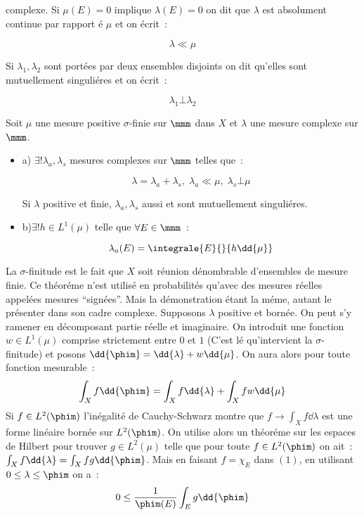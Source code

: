 complexe. Si $\mu(E) = 0$ implique $\lambda(E) = 0$ on dit que $\lambda$ est absolument continue par rapport é $\mu$
et on écrit~:\par
$$\lambda\ll \mu$$\par
Si $\lambda_1, \lambda_2$ sont portées par deux ensembles disjoints on dit qu'elles sont mutuellement singuliéres et
on écrit~:\par
$$\lambda_1\bot \lambda_2$$\par
{}
Soit $\mu$ une mesure positive $\sigma$-finie sur $\mmm$ dans $X$ et $\lambda$ une mesure complexe sur $\mmm$.
\begin{itemize}
\item{a)} $\exists !\lambda_a, \lambda_s$ mesures complexes sur $\mmm$ telles que~:\par
$$\lambda = \lambda_a + \lambda_s,\; \lambda_a\ll \mu,\; \lambda_s\bot\mu$$\par
Si $\lambda$ positive et finie, $\lambda_a,\lambda_s$ aussi et sont mutuellement singuliéres.
\item{b)}$\exists ! h\in L^1(\mu)$ telle que $\forall E\in \mmm$~:\par
$$\lambda_a(E) = \integrale{E}{}{h\dd{\mu}}$$
\end{itemize}
La $\sigma$-finitude est le fait que $X$ soit réunion dénombrable d'ensembles de mesure finie.
\rmq Ce théoréme n'est utilisé en probabilités qu'avec des mesures réelles appelées mesures ``signées''. Mais la 
démonstration étant la méme, autant le présenter dans son cadre complexe. 
\dem Supposons $\lambda$ positive et bornée. On peut s'y ramener en décomposant partie réelle et imaginaire. On 
introduit une fonction $w\in L^1(\mu)$ comprise strictement entre $0$ et $1$ (C'est lé qu'intervient la 
$\sigma$-finitude) et posons $\dd{\phim} = \dd{\lambda}+ w\dd{\mu}$. On aura alors pour toute fonction mesurable~:
\begin{equation}
\int_X f\dd{\phim} = \int_X f\dd{\lambda} + \int_X fw\dd{\mu}
\end{equation}
Si $f\in L^2(\phim)$ l'inégalité de Cauchy-Schwarz montre que $f\to \int_X f\dd{\lambda}$ est une forme linéaire
bornée sur $L^2(\phim)$. On utilise alors un théoréme sur les espaces de Hilbert pour trouver $g\in L^2(\mu)$
telle que pour toute $f\in L^2(\phim)$ on ait~: $\int_X f\dd{\lambda} = \int_X fg\dd{\phim}$. Mais en faisant 
$f =\chi_E$ dans $(1)$, en utilisant $0\leq \lambda\leq \phim$ on a~:
\begin{equation}
0\leq \frac{1}{\phim(E)}\int_E g\dd{\phim}
\end{equation}
